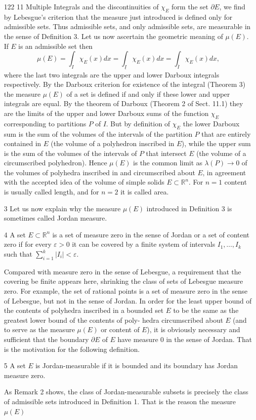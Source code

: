122
11 Multiple Integrals
and the discontinuities of $\chi_E$ form the set $\partial E$, we find by Lebesgue's criterion that
the measure just introduced is defined only for admissible sets.
Thus admissible sets, and only admissible sets, are measurable in the sense of
Definition 3.
Let us now ascertain the geometric meaning of $\mu(E)$. If $E$ is an admissible set
then
$$\mu(E) = \int_I \chi_E(x) dx = \int_{\underline{I}} \chi_E(x)dx = \int_{\overline{I}} \chi_E(x) dx,$$
where the last two integrals are the upper and lower Darboux integrals respectively.
By the Darboux criterion for existence of the integral (Theorem 3) the measure
$\mu(E)$ of a set is defined if and only if these lower and upper integrals are equal.
By the theorem of Darboux (Theorem 2 of Sect. 11.1) they are the limits of the
upper and lower Darboux sums of the function $\chi_E$ corresponding to partitions $P$
of $I$. But by definition of $\chi_E$ the lower Darboux sum is the sum of the volumes
of the intervals of the partition $P$ that are entirely contained in $E$ (the volume of a
polyhedron inscribed in $E$), while the upper sum is the sum of the volumes of the
intervals of $P$ that intersect $E$ (the volume of a circumscribed polyhedron). Hence
$\mu(E)$ is the common limit as $\lambda(P) \to 0$ of the volumes of polyhedra inscribed in
and circumscribed about $E$, in agreement with the accepted idea of the volume of
simple solids $E \subset \mathbb{R}^n$.
For $n = 1$ content is usually called length, and for $n = 2$ it is called area.
\begin{remark}{3} Let us now explain why the measure $\mu(E)$ introduced in Definition 3 is
sometimes called Jordan measure.
\end{remark}
\begin{definition}{4} A set $E \subset \mathbb{R}^n$ is a set of measure zero in the sense of Jordan or a set
of content zero if for every $\varepsilon > 0$ it can be covered by a finite system of intervals
$I_1, \dots, I_k$ such that $\sum_{i=1}^k |I_i| < \varepsilon$.
\end{definition}
Compared with measure zero in the sense of Lebesgue, a requirement that the
covering be finite appears here, shrinking the class of sets of Lebesgue measure
zero. For example, the set of rational points is a set of measure zero in the sense of
Lebesgue, but not in the sense of Jordan.
In order for the least upper bound of the contents of polyhedra inscribed in a
bounded set $E$ to be the same as the greatest lower bound of the contents of poly-
hedra circumscribed about $E$ (and to serve as the measure $\mu(E)$ or content of $E$), it
is obviously necessary and sufficient that the boundary $\partial E$ of $E$ have measure $0$ in
the sense of Jordan. That is the motivation for the following definition.
\begin{definition}{5} A set $E$ is Jordan-measurable if it is bounded and its boundary has
Jordan measure zero.
\end{definition}
As Remark 2 shows, the class of Jordan-measurable subsets is precisely the class
of admissible sets introduced in Definition 1. That is the reason the measure $\mu(E)$